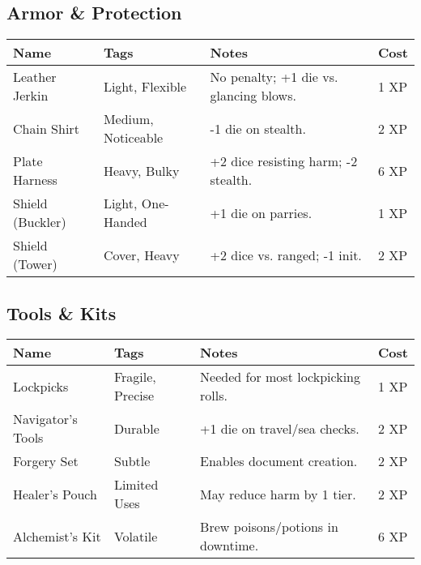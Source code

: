 \documentclass[12pt]{book}
\begin{document}
\subsection*{Armor \& Protection}
\begin{tabular}{@{}llll@{}}
\toprule
\textbf{Name} & \textbf{Tags} & \textbf{Notes} & \textbf{Cost} \\
\midrule
Leather Jerkin & Light, Flexible & No penalty; +1 die vs. glancing blows. & 1 XP \\
Chain Shirt & Medium, Noticeable & -1 die on stealth. & 2 XP \\
Plate Harness & Heavy, Bulky & +2 dice resisting harm; -2 stealth. & 6 XP \\
Shield (Buckler) & Light, One-Handed & +1 die on parries. & 1 XP \\
Shield (Tower) & Cover, Heavy & +2 dice vs. ranged; -1 init. & 2 XP \\
\bottomrule
\end{tabular}

\subsection*{Tools \& Kits}
\begin{tabular}{@{}llll@{}}
\toprule
\textbf{Name} & \textbf{Tags} & \textbf{Notes} & \textbf{Cost} \\
\midrule
Lockpicks & Fragile, Precise & Needed for most lockpicking rolls. & 1 XP \\
Navigator’s Tools & Durable & +1 die on travel/sea checks. & 2 XP \\
Forgery Set & Subtle & Enables document creation. & 2 XP \\
Healer’s Pouch & Limited Uses & May reduce harm by 1 tier. & 2 XP \\
Alchemist’s Kit & Volatile & Brew poisons/potions in downtime. & 6 XP \\
\bottomrule
\end{tabular}
\end{document}
